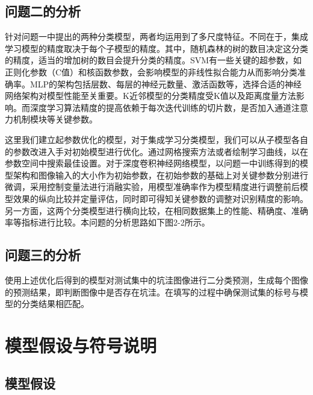 \documentclass[a4paper, 10pt]{article}
\begin{document}
	
	\subsection{问题二的分析}
	
	针对问题一中提出的两种分类模型，两者均运用到了多尺度特征。不同在于，集成学习模型的精度取决于每个子模型的精度。其中，随机森林的树的数目决定这分类的精度，适当的增加树的数目会提升分类的精度。SVM有一些关键的超参数，如正则化参数（C值）和核函数参数，会影响模型的非线性拟合能力从而影响分类准确率。MLP的架构包括层数、每层的神经元数量、激活函数等，选择合适的神经网络架构对模型性能至关重要。K近邻模型的分类精度受K值以及距离度量方法影响。而深度学习算法精度的提高依赖于每次迭代训练的切片数，是否加入通道注意力机制模块等关键参数。	
	
	这里我们建立起参数优化的模型，对于集成学习分类模型，我们可以从子模型各自的参数改进入手对初始模型进行优化。通过网格搜索方法或者绘制学习曲线，以在参数空间中搜索最佳设置。对于深度卷积神经网络模型，以问题一中训练得到的模型架构和图像输入的大小作为初始参数，在初始参数的基础上对关键参数分别进行微调，采用控制变量法进行消融实验，用模型准确率作为模型精度进行调整前后模型效果的纵向比较并定量评估，同时即可得知关键参数的调整对识别精度的影响。另一方面，这两个分类模型进行横向比较，在相同数据集上的性能、精确度、准确率等指标进行比较。本问题的分析思路如下图2-2所示。
	
	\subsection{问题三的分析}
	
	使用上述优化后得到的模型对测试集中的坑洼图像进行二分类预测，生成每个图像的预测结果，即判断图像中是否存在坑洼。在填写的过程中确保测试集的标号与模型的分类结果相匹配。
	
	\section{模型假设与符号说明}
	
	\subsection{模型假设}
	
\end{document}
